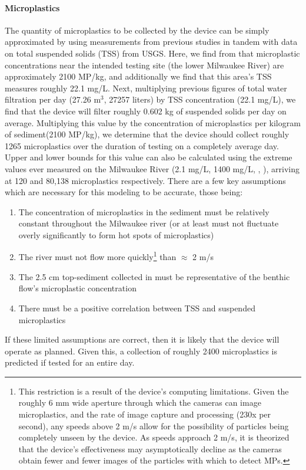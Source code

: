 \documentclass[fleqn,10pt]{SelfArx} %
\begin{document}
	\paragraph{Microplastics}
	The quantity of microplastics to be collected by the device can be simply approximated by using measurements from previous studies in tandem with data on total suspended solids (TSS) from USGS. Here, we find from \cite{LenakerEtAlvertdist} that microplastic concentrations near the intended testing site (the lower Milwaukee River) are approximately 2100 MP/kg, and additionally we find that this area's TSS measures roughly 22.1 mg/L. Next, multiplying previous figures of total water filtration per day (27.26 m$^3$, 27257 liters) by TSS concentration (22.1 mg/L), we find that the device will filter roughly 0.602 kg of suspended solids per day on average. Multiplying this value by the concentration of microplastics per kilogram of sediment(2100 MP/kg), we determine that the device should collect roughly 1265 microplastics over the duration of testing on a completely average day. Upper and lower bounds for this value can also be calculated using the extreme values ever measured on the Milwaukee River (2.1 mg/L, 1400 mg/L, \cite{USGSMil}, \cite{MKETSS}), arriving at 120 and 80,138 microplastics respectively. 
	\linebreak
	There are a few key assumptions which are necessary for this modeling to be accurate, those being:
	\begin{enumerate}
		\item The concentration of microplastics in the sediment must be relatively constant throughout the Milwaukee river (or at least must not fluctuate overly significantly to form hot spots of microplastics)
		\item The river must not flow more quickly\footnote{This restriction is a result of the device's computing limitations. Given the roughly 6 mm wide aperture through which the cameras can image microplastics, and the rate of image capture and processing (230x per second), any speeds above 2 m/s allow for the possibility of particles being completely unseen by the device. As speeds approach 2 m/s, it is theorized that the device's effectiveness may asymptotically decline as the cameras obtain fewer and fewer images of the particles with which to detect MPs.} than $\approx$ 2 m/s
		\item The 2.5 cm top-sediment collected in \cite{LenakerEtAlvertdist} must be representative of the \gls{benthic} flow's microplastic concentration
		\item There must be a positive correlation between TSS and suspended microplastics
	\end{enumerate}
	If these limited assumptions are correct, then it is likely that the device will operate as planned. Given this, a collection of roughly 2400 microplastics is predicted if tested for an entire day.
	
\end{document}
